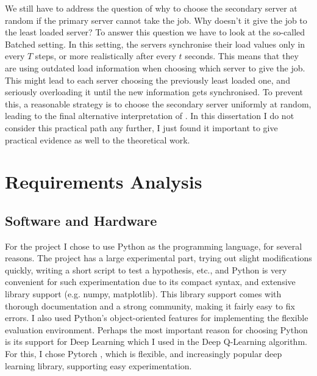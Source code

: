 We still have to address the question of why to choose the secondary server at random if the primary server cannot take the job. Why doesn't it give the job to the least loaded server? To answer this question we have to look at the so-called Batched setting. In this setting, the servers synchronise their load values only in every $T$ steps, or more realistically after every $t$ seconds. This means that they are using outdated load information when choosing which server to give the job. This might lead to each server choosing the previously least loaded one, and seriously overloading it until the new information gets synchronised. To prevent this, a reasonable strategy is to choose the secondary server uniformly at random, leading to the final alternative interpretation of \TwoThinning. In this dissertation I do not consider this practical path any further, I just found it important to give practical evidence as well to the theoretical work.
\fi

\section{Requirements Analysis}





\subsection{Software and Hardware}


For the project I chose to use Python as the programming language, for several reasons. The project has a large experimental part, trying out slight modifications quickly, writing a short script to test a hypothesis, etc., and Python is very convenient for such experimentation due to its compact syntax, and extensive library support (e.g. numpy, matplotlib). This library support comes with thorough documentation and a strong community, making it fairly easy to fix errors. I also used Python's object-oriented features for implementing the flexible evaluation environment. Perhaps the most important reason for choosing Python is its support for Deep Learning which I used in the Deep Q-Learning algorithm. For this, I chose Pytorch \cite{ketkar2021pytorch}, which is flexible, and increasingly popular deep learning library, supporting easy experimentation.


